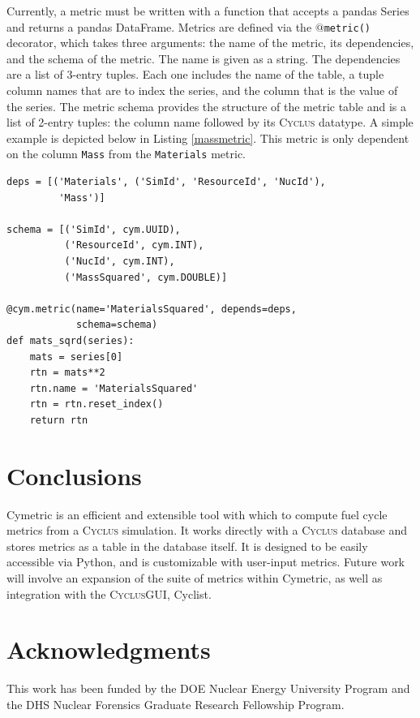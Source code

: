 \documentclass{anstrans}
\newcommand{\cyclus}{\textsc{Cyclus}\xspace}
\newcommand{\code}[1]{{\color{code}\texttt{#1}}}
\begin{document}
Currently, a metric must be written with a function that accepts a pandas 
Series and returns a pandas DataFrame. Metrics are defined via the
\code{$@$metric()} decorator, which takes three arguments: the name of the 
metric, its dependencies, and the schema of the metric. 
The name is given as a string. The dependencies are a list of 3-entry tuples. 
Each one includes the name of the table, a tuple column names that are to 
index the series, and the column that is the value of the series. 
The metric schema provides the structure of the metric table and is a 
list of 2-entry tuples: the column name followed by its \cyclus datatype. 
A simple example is depicted below in Listing \ref{massmetric}. This metric 
is only dependent on the column \code{Mass} from the \code{Materials} metric. 

\begin{lstlisting}[caption ={Writing a Metric in Cymetric}, label=massmetric]
deps = [('Materials', ('SimId', 'ResourceId', 'NucId'), 
         'Mass')]

schema = [('SimId', cym.UUID), 
          ('ResourceId', cym.INT),
          ('NucId', cym.INT),  
          ('MassSquared', cym.DOUBLE)]

@cym.metric(name='MaterialsSquared', depends=deps, 
            schema=schema)
def mats_sqrd(series):
    mats = series[0]
    rtn = mats**2
    rtn.name = 'MaterialsSquared'
    rtn = rtn.reset_index()
    return rtn
\end{lstlisting}


\section{Conclusions}

Cymetric is an efficient and extensible tool with which to compute fuel cycle metrics from a \cyclus simulation. 
It works directly with a \cyclus database and stores metrics as a table in the database itself. 
It is designed to be easily accessible via Python, and is customizable with user-input metrics. 
Future work will involve an expansion of the suite of metrics within Cymetric, as well as 
integration with the \cyclus \gls{GUI}, Cyclist. \cite{livnat_cyclist_2014}

\section{Acknowledgments}
This work has been funded by the \gls{DOE} Nuclear Energy University Program and 
the \gls{DHS} Nuclear Forensics Graduate Research Fellowship Program. 



\end{document}
